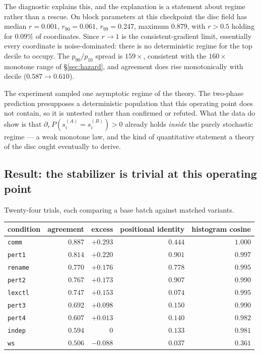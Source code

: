 The diagnostic explains this, and the explanation is a statement about regime
rather than a rescue. On block parameters at this checkpoint the disc field has
median $r=0.001$, $r_{90}=0.061$, $r_{99}=0.247$, maximum $0.879$, with
$r>0.5$ holding for $0.09\%$ of coordinates. Since $r\to1$ is the
consistent-gradient limit, essentially every coordinate is noise-dominated:
there is no deterministic regime for the top decile to occupy. The $p_{90}/p_{10}$
spread is $159\times$, consistent with the $160\times$ monotone range of
\S\ref{sec:hazard}, and agreement does rise monotonically with decile
($0.587\to0.610$).

\begin{observation}
\label{obs:regime}
The experiment sampled one asymptotic regime of the theory. The two-phase
prediction presupposes a deterministic population that this operating point
does not contain, so it is untested rather than confirmed or refuted. What the
data do show is that
$\partial_r\,P\!\left(s_i^{(A)}=s_i^{(B)}\right)>0$ already holds \emph{inside}
the purely stochastic regime --- a weak monotone law, and the kind of
quantitative statement a theory of the disc ought eventually to derive.
\end{observation}

\subsection{Result: the stabilizer is trivial at this operating point}
\label{sec:stabilizer-result}

Twenty-four trials, each comparing a base batch against matched variants.

\begin{center}
\begin{tabular}{lrrrr}
\hline
condition & agreement & excess & positional identity & histogram cosine \\
\hline
\texttt{comm}   & $0.887$ & $+0.293$ & $0.444$ & $1.000$ \\
\texttt{pert1}  & $0.814$ & $+0.220$ & $0.901$ & $0.997$ \\
\texttt{rename} & $0.770$ & $+0.176$ & $0.778$ & $0.995$ \\
\texttt{pert2}  & $0.767$ & $+0.173$ & $0.907$ & $0.990$ \\
\texttt{lexctl} & $0.747$ & $+0.153$ & $0.074$ & $0.995$ \\
\texttt{pert3}  & $0.692$ & $+0.098$ & $0.150$ & $0.990$ \\
\texttt{pert4}  & $0.607$ & $+0.013$ & $0.140$ & $0.982$ \\
\texttt{indep}  & $0.594$ & $0$      & $0.133$ & $0.981$ \\
\texttt{ws}     & $0.506$ & $-0.088$ & $0.037$ & $0.361$ \\
\hline
\end{tabular}
\end{center}


